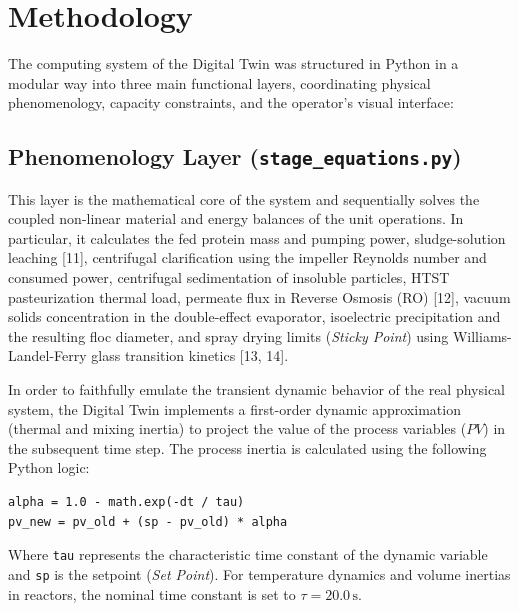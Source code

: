 \documentclass[10pt,letterpaper,twocolumn]{article}
\begin{document}
\section{Methodology}

The computing system of the Digital Twin was structured in Python in a modular way into three main functional layers, coordinating physical phenomenology, capacity constraints, and the operator's visual interface:

\subsection{Phenomenology Layer (\texttt{stage\_equations.py})}
This layer is the mathematical core of the system and sequentially solves the coupled non-linear material and energy balances of the unit operations. In particular, it calculates the fed protein mass and pumping power, sludge-solution leaching [11], centrifugal clarification using the impeller Reynolds number and consumed power, centrifugal sedimentation of insoluble particles, HTST pasteurization thermal load, permeate flux in Reverse Osmosis (RO) [12], vacuum solids concentration in the double-effect evaporator, isoelectric precipitation and the resulting floc diameter, and spray drying limits (\textit{Sticky Point}) using Williams-Landel-Ferry glass transition kinetics [13, 14].

In order to faithfully emulate the transient dynamic behavior of the real physical system, the Digital Twin implements a first-order dynamic approximation (thermal and mixing inertia) to project the value of the process variables ($\mathit{PV}$) in the subsequent time step. The process inertia is calculated using the following Python logic:
\begin{verbatim}
alpha = 1.0 - math.exp(-dt / tau)
pv_new = pv_old + (sp - pv_old) * alpha
\end{verbatim}
Where \texttt{tau} represents the characteristic time constant of the dynamic variable and \texttt{sp} is the setpoint (\textit{Set Point}). For temperature dynamics and volume inertias in reactors, the nominal time constant is set to $\tau = 20.0\,\text{s}$.
\end{document}
